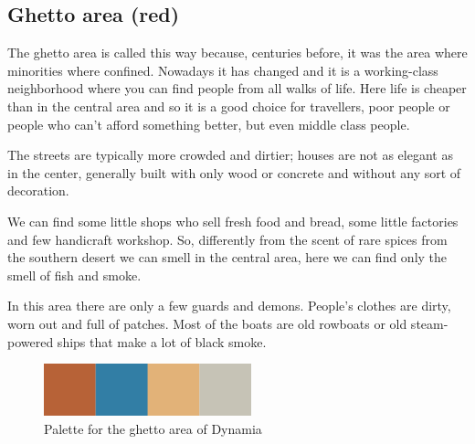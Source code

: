 \subsection{Ghetto area (red)}
The ghetto area is called this way because, centuries before, it was the area where  minorities where confined. Nowadays it has changed and it is a working-class neighborhood where you can find people from all walks of life. Here life is cheaper than in the central area and so it is a good choice for travellers, poor people or people who can't afford something better, but even middle class people.

The streets are typically more crowded and dirtier; houses are not as elegant as in the center, generally built with only wood or concrete and without any sort of decoration.

We can find some little shops who sell fresh food and bread, some little factories and few handicraft workshop. So, differently from the scent of rare spices from the southern desert we can smell in the central area, here we can find only the smell of fish and smoke.

In this area there are only a few guards and demons. People's clothes are dirty, worn out and full of patches. Most of the boats are old rowboats or old steam-powered ships that make a lot of black smoke.

\begin{figure}[H]
  \centering
  \includegraphics[width=6cm]{Images/Palettes/dynamiaGhettoArea}
  \caption{Palette for the ghetto area of Dynamia}
\end{figure}
